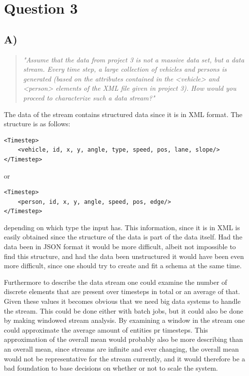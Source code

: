 \section{Question 3}

\subsection{A)}
\begin{quote}
	\textit{"Assume	that	the	data	from	project	3	is	not	a	massive	data	set,	but	a	data	stream.	Every	time	step,	a	large	collection	of	vehicles	and	persons	is	generated	(based	on	the	attributes	contained	in	the	<vehicle>	and	<person>	elements	of	the	XML	file	given	in	project	3).	How	would	you	proceed	to	characterize	such	a	data	stream?"}
\end{quote}
The data of the stream contains structured data since it is in XML format. The structure is as follows:
\begin{verbatim}
<Timestep>
    <vehicle, id, x, y, angle, type, speed, pos, lane, slope/>
</Timestep>
\end{verbatim}
or 
\begin{verbatim}
<Timestep>
    <person, id, x, y, angle, speed, pos, edge/>
</Timestep>
\end{verbatim}
depending on which type the input has. This information, since it is in XML is easily obtained since the structure of the data is part of the data itself. Had the data been in JSON format it would be more difficult, albeit not impossible to find this structure, and had the data been unstructured it would have been even more difficult, since one should try to create and fit a schema at the same time.

Furthermore to describe the data stream one could examine the number of discrete elements that are present over timesteps in total or an average of that. Given these values it becomes obvious that we need big data systems to handle the stream. This could be done either with batch jobs, but it could also be done by making windowed stream analysis. By examining a window in the stream one could approximate the average amount of entities pr timesteps. This approximation of the overall mean would probably also be more describing than an overall mean, since streams are infinite and ever changing, the overall mean would not be representative for the stream currently, and it would therefore be a bad foundation to base decisions on whether or not to scale the system.

